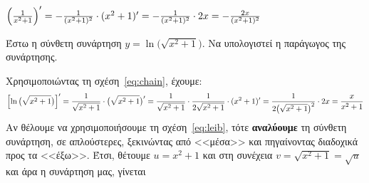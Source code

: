   \begin{example}
    $ \Bigl(\frac{1}{x^{2}+1} \Bigr)' = - \frac{1}{(x^{2}+1)^{2}} \cdot (x^{2}+1)' = 
    - \frac{1}{(x^{2}+1)^{2}} \cdot 2x = - \frac{2x}{(x^{2}+1)^{2}} $ 
  \end{example}
  \begin{exercise}
    Έστω η σύνθετη συνάρτηση $ y= \ln{\bigl(\sqrt{x^{2}+1}\bigr)} $. 
    Να υπολογιστεί η παράγωγος της συνάρτησης.  
  \end{exercise}
  \begin{solution}
    Χρησιμοποιώντας τη σχέση~\eqref{eq:chain}, έχουμε:
    \[
      \Bigl[\ln{\bigl(\sqrt{x^{2}+1}\bigr)} \Bigr]' = \frac{1}{\sqrt{x^{2}+1}} \cdot 
      \bigl(\sqrt{x^{2}+1} \bigr)' = \frac{1}{\sqrt{x^{2}+1}} \cdot 
      \frac{1}{2 \sqrt{x^{2}+1}} \cdot (x^{2}+1)' = \frac{1}{2 
      \bigl(\sqrt{x^{2}+1}\bigr)^{2}} \cdot 2x = \frac{x}{x^{2}+1}
    \]  
    Αν θέλουμε να χρησιμοποιήσουμε τη σχέση~\eqref{eq:leib}, τότε \textbf{αναλύουμε} 
    τη σύνθετη συνάρτηση, σε απλούστερες, ξεκινώντας από <<μέσα>> και πηγαίνοντας 
    διαδοχικά προς τα <<έξω>>. Έτσι, θέτουμε $ u=x^{2}+1 $ και στη συνέχεια
    $v= \sqrt{x^{2}+1} = \sqrt{u} $ και άρα η συνάρτηση μας, γίνεται

  \end{solution}


